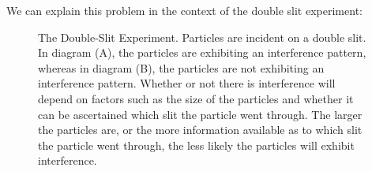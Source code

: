 \documentclass[12pt]{report}
\providecommand{\DIFaddbeginFL}{} %
\providecommand{\DIFaddendFL}{} %
\providecommand{\DIFdelbeginFL}{} %
\providecommand{\DIFdelendFL}{} %
\begin{document}
    We can explain this problem in the context of the double slit experiment:
    \begin{figure}[ht!]
    \captionsetup{justification=justified}
    \centering
    \vspace*{10px}
    \DIFdelbeginFL %
\DIFdelendFL \DIFaddbeginFL \caption[Double-Slit Experiment]{\DIFaddendFL The Double-Slit Experiment. Particles are incident on a double slit. In diagram (A), the particles are exhibiting an interference pattern, whereas in diagram (B), the particles are not exhibiting an interference pattern. Whether or not there is interference will depend on factors such as the size of the particles and whether it can be ascertained which slit the particle went through. The larger the particles are, or the more information available as to which slit the particle went through, the less likely the particles will exhibit interference.\protect\footnotemark}
    \label{DoubleSlit}
    \end{figure}
\end{document}
